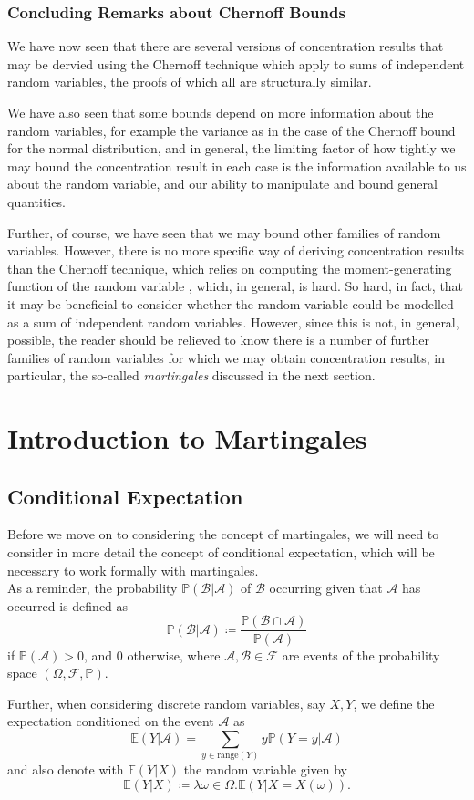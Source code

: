 	\subsubsection{Concluding Remarks about Chernoff Bounds}
	We have now seen that there are several versions of concentration results that may be 
	dervied using the Chernoff technique which apply to sums of independent random variables, 
	the proofs of which all are structurally similar. \par
	We have also seen that some bounds depend on more information about the random variables, 
	for example the variance as in the case of the Chernoff bound for the normal distribution, 
	and in general, the limiting factor of how tightly we may bound the concentration result 
	in each case is the information available to us about the random variable, and our ability 
	to manipulate and bound general quantities. \par
	Further, of course, we have seen that we may bound other families of random variables. 
	However, there is no more specific way of deriving concentration results than the Chernoff 
	technique, which relies on computing the moment-generating function of the random variable%
	, which, in general, is hard. So hard, in fact, that it may be beneficial to consider 
	whether the random variable could be modelled as a sum of independent random variables. 
	However, since this is not, in general, possible, the reader should be relieved to know 
	there is a number of further families of random variables for which we may obtain 
	concentration results, in particular, the so-called \emph{martingales} discussed in the 
	next section.

\section{Introduction to Martingales}
	\subsection{Conditional Expectation}
	Before we move on to considering the concept of martingales, we will need to consider in 
	more detail the concept of conditional expectation, which will be necessary to work 
	formally with martingales. \\
	As a reminder, the probability $\mathbb{P}(\mathcal{B} | \mathcal{A})$ of $\mathcal{B}$ 
	occurring given that $\mathcal{A}$ has occurred is defined as 
	$$
		\mathbb{P}(\mathcal{B} | \mathcal{A}) \coloneqq 
		\frac{\mathbb{P}(\mathcal{B} \cap \mathcal{A})}{\mathbb{P}(\mathcal{A})}
	$$
	if $\mathbb{P}(\mathcal{A}) > 0$, and $0$ otherwise, where $\mathcal{A},\mathcal{B}\in 
	\mathcal{F}$ are events of the  probability space $(\Omega, \mathcal{F}, \mathbb{P})$.
	\par
	Further, when considering discrete random variables, say $X, Y$, we define the expectation 
	conditioned on the event $\mathcal{A}$ as
	$$
		\mathbb{E}(Y|\mathcal{A})=\sum_{y\in\mathrm{range}(Y)}y\mathbb{P}(Y=y|\mathcal{A})
	$$
	and also denote with $\mathbb{E}(Y|X)$ the random variable given by 
	$$
		\mathbb{E}(Y|X) \coloneqq \lambda \omega\in \Omega . \mathbb{E}(Y | X=X(\omega)).
	$$

